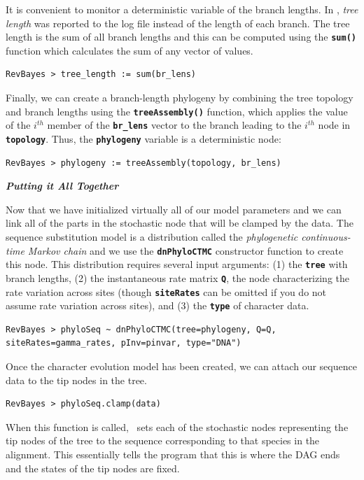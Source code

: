 \documentclass[11pt]{article}
\newcommand{\cl}[1]{{\texttt{\textbf{#1}}}}
\begin{document}
It is convenient to monitor a deterministic variable of the branch lengths. In \MrBayes, \textit{tree length} was reported to the log file instead of the length of each branch. The tree length is the sum of all branch lengths and this can be computed using the \cl{sum()} function which calculates the sum of any vector of values.
{\tt \begin{snugshade*}
\begin{lstlisting}
RevBayes > tree_length := sum(br_lens)
\end{lstlisting}
\end{snugshade*}}

Finally, we can create a branch-length phylogeny by combining the tree topology and branch lengths using the \cl{treeAssembly()} function, which applies the value of the $i^{th}$ member of the \cl{br\_lens} vector to the branch leading to the $i^{th}$ node in \cl{topology}. Thus, the \cl{phylogeny} variable is a deterministic node: 

{\tt \begin{snugshade*}
\begin{lstlisting}
RevBayes > phylogeny := treeAssembly(topology, br_lens)
\end{lstlisting}
\end{snugshade*}}



\textbf{\textit{Putting it All Together}}

Now that we have initialized virtually all of our model parameters and we can link all of the parts in the stochastic node that will be clamped by the data. 
The sequence substitution model is a distribution called the \textit{phylogenetic continuous-time Markov chain} and we use the \cl{dnPhyloCTMC} constructor function to create this node.
This distribution requires several input arguments: (1) the \cl{tree} with branch lengths, (2) the instantaneous rate matrix \cl{Q}, the node characterizing the rate variation across sites (though \cl{siteRates} can be omitted if you do not assume rate variation across sites), and (3) the \cl{type} of character data.
{\tt \begin{snugshade*}
\begin{lstlisting}
RevBayes > phyloSeq ~ dnPhyloCTMC(tree=phylogeny, Q=Q, siteRates=gamma_rates, pInv=pinvar, type="DNA")
\end{lstlisting}
\end{snugshade*}}


Once the character evolution model has been created, we can attach our sequence data to the tip nodes in the tree.
{\tt \begin{snugshade*}
\begin{lstlisting}
RevBayes > phyloSeq.clamp(data)
\end{lstlisting}
\end{snugshade*}}
When this function is called, \RevBayes~sets each of the stochastic nodes representing the tip nodes of the tree to the sequence corresponding to that species in the alignment. 
This essentially tells the program that this is where the DAG ends and the states of the tip nodes are fixed. 
\end{document}
